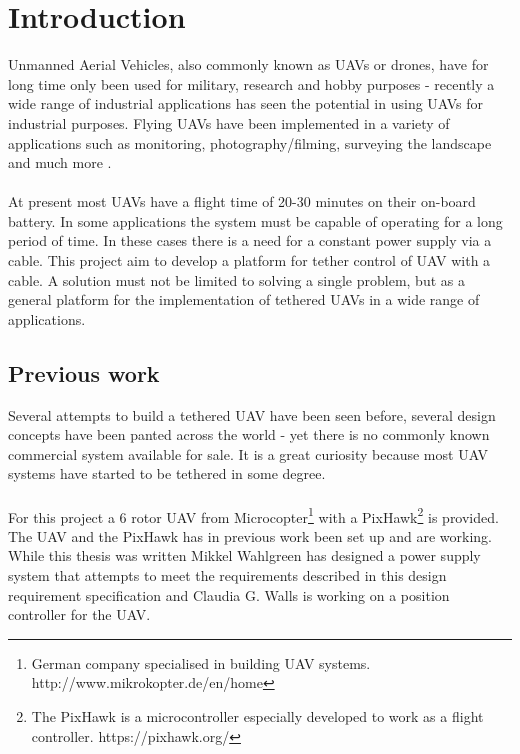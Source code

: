 \chapter{Introduction}

Unmanned Aerial Vehicles, also commonly known as UAVs or drones, have for long time only been used for military, research and hobby purposes - recently a wide range of industrial applications has seen the potential in using UAVs for industrial purposes.
Flying UAVs have been implemented in a variety of applications such as monitoring, photography/filming, surveying the landscape and much more \cite{Dandrone2015}.\\
\\
At present most UAVs have a flight time of 20-30 minutes on their on-board battery.
In some applications the system must be capable of operating for a long period of time. In these cases there is a need for a constant power supply via a cable. This project aim to develop a platform for tether control of UAV with a cable.
A solution must not be limited to solving a single problem, but as a general platform for the implementation of tethered UAVs in a wide range of applications.


\section{Previous work}
Several attempts to build a tethered UAV have been seen before, several design concepts have been panted across the world \cite{Peverill2013} - yet there is no commonly known commercial system available for sale. It is a great curiosity because most UAV systems have started to be tethered in some degree.\\
\\
For this project a 6 rotor UAV from Microcopter\footnote{German company specialised in building UAV systems. http://www.mikrokopter.de/en/home} with a PixHawk\footnote{The PixHawk is a microcontroller especially developed to work as a flight controller. https://pixhawk.org/} is provided. The UAV and the PixHawk has in previous work been set up and are working.\\
\noindent
While this thesis was written Mikkel Wahlgreen has designed a power supply system \cite{Wahlgreen2014} that attempts to meet the requirements described in this design requirement specification and Claudia G. Walls is working on a position controller for the UAV.\\
 


